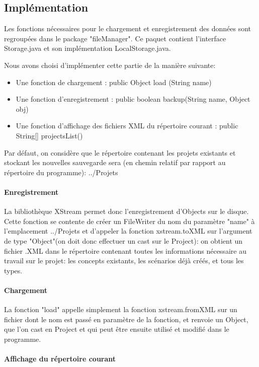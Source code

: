 \documentclass[12pt]{report}
\begin{document}
\subsection{Implémentation}

	Les fonctions nécessaires pour le chargement et enregistrement des données sont regroupées dans le package "fileManager".
Ce paquet contient l'interface Storage.java et son implémentation LocalStorage.java.

	Nous avons choisi d'implémenter cette partie de la manière suivante:
	\begin{itemize}
	\item Une fonction de chargement : public Object load (String name)
	\item Une fonction d'enregistrement : public boolean backup(String name, Object obj)
	\item Une fonction d'affichage des fichiers XML du répertoire courant : public String[] projectsList()
	\end{itemize}


Par défaut, on considère que le répertoire contenant les projets existants et stockant les nouvelles sauvegarde sera (en chemin relatif par rapport
au répertoire du programme): ../Projets

	\paragraph{Enregistrement}

La bibliothèque XStream permet donc l'enregistrement d'Objects sur le disque. Cette fonction se contente de créer un FileWriter du nom du paramètre "name"
à l'emplacement ../Projets et d'appeler la fonction xstream.toXML sur l'argument de type "Object"(on doit donc effectuer un cast sur le Project): on obtient un fichier .XML dans le répertoire contenant
toutes les informations nécessaire au travail sur le projet: les concepts existants, les scénarios déjà créés, et tous les types.

	\paragraph{Chargement}

La fonction "load" appelle simplement la fonction xstream.fromXML sur un fichier dont le nom est passé en paramètre de la fonction, et renvoie un Object,
que l'on cast en Project et qui peut être ensuite utilisé et modifié dans le programme.

	\paragraph{Affichage du répertoire courant}
\end{document}
